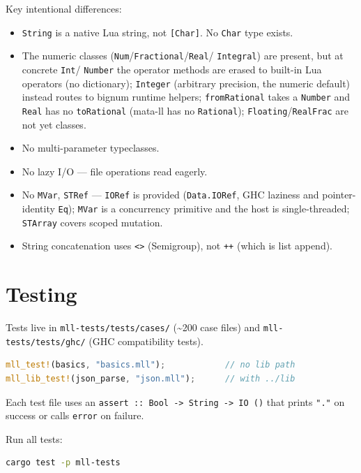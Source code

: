 \documentclass[11pt,a4paper]{article}
\begin{document}
Key intentional differences:
\begin{itemize}[nosep]
  \item \texttt{String} is a native Lua string, not \texttt{[Char]}.
        No \texttt{Char} type exists.
  \item The numeric classes (\texttt{Num}/\texttt{Fractional}/\texttt{Real}/
        \texttt{Integral}) are present, but at concrete \texttt{Int}/
        \texttt{Number} the operator methods are erased to built-in Lua
        operators (no dictionary); \texttt{Integer} (arbitrary precision,
        the numeric default) instead routes to bignum runtime helpers;
        \texttt{fromRational} takes a \texttt{Number}
        and \texttt{Real} has no \texttt{toRational} (mata-ll has no
        \texttt{Rational}); \texttt{Floating}/\texttt{RealFrac} are not yet
        classes.
  \item No multi-parameter typeclasses.
  \item No lazy I/O --- file operations read eagerly.
  \item No \texttt{MVar}, \texttt{STRef} --- \texttt{IORef} is provided
        (\texttt{Data.IORef}, GHC laziness and pointer-identity
        \texttt{Eq}); \texttt{MVar} is a concurrency primitive and the
        host is single-threaded; \texttt{STArray} covers scoped mutation.
  \item String concatenation uses \texttt{<>} (Semigroup), not \texttt{++}
        (which is list append).
\end{itemize}

\section{Testing}

Tests live in \texttt{mll-tests/tests/cases/} (\textasciitilde200 case files) and
\texttt{mll-tests/tests/ghc/} (GHC compatibility tests).

\begin{lstlisting}[language=Rust]
mll_test!(basics, "basics.mll");            // no lib path
mll_lib_test!(json_parse, "json.mll");      // with ../lib
\end{lstlisting}

Each test file uses an \texttt{assert :: Bool -> String -> IO ()} that prints
\texttt{"."} on success or calls \texttt{error} on failure.

Run all tests:
\begin{lstlisting}[language=bash]
cargo test -p mll-tests
\end{lstlisting}
\end{document}
